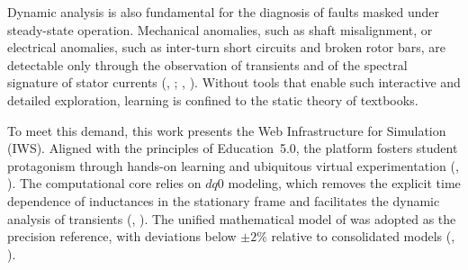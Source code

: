 \documentclass[a4paper]{ifacconf}
\begin{document}
\begin{table}[htbp]
\centering
\caption{Functional comparison between the proposed IWS and conventional simulation tools.}
\label{tab:tool_comparison_en}
\end{table}

Dynamic analysis is also fundamental for the diagnosis of faults masked under steady-state operation. Mechanical anomalies, such as shaft misalignment, or electrical anomalies, such as inter-turn short circuits and broken rotor bars, are detectable only through the observation of transients and of the spectral signature of stator currents (\citeauthor{tuanmohamad2024advance}, \citeyear{tuanmohamad2024advance}; \citeauthor{arkan2005modelling}, \citeyear{arkan2005modelling}). Without tools that enable such interactive and detailed exploration, learning is confined to the static theory of textbooks.

To meet this demand, this work presents the Web Infrastructure for Simulation (IWS). Aligned with the principles of Education~5.0, the platform fosters student protagonism through hands-on learning and ubiquitous virtual experimentation (\citeauthor{cordeiro2024educacao}, \citeyear{cordeiro2024educacao}). The computational core relies on $dq0$ modeling, which removes the explicit time dependence of inductances in the stationary frame and facilitates the dynamic analysis of transients (\citeauthor{sengamalai2022three}, \citeyear{sengamalai2022three}). The unified mathematical model of \cite{usta2024mathematical} was adopted as the precision reference, with deviations below $\pm 2\%$ relative to consolidated models (\citeauthor{leroux2022static}, \citeyear{leroux2022static}).
\end{document}
